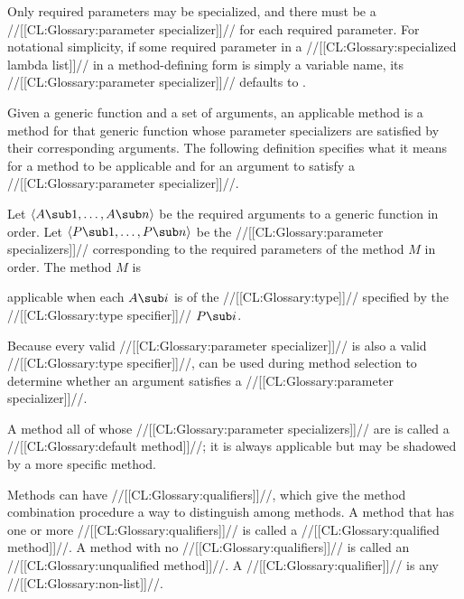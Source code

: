 Only required parameters may be specialized, and there must be a
//[[CL:Glossary:parameter specializer]]// for each required parameter.  For notational
simplicity, if some required parameter in a //[[CL:Glossary:specialized lambda list]]// in
a method-defining form is simply a variable name, its 
//[[CL:Glossary:parameter specializer]]// defaults to .

Given a generic function and a set of arguments, an applicable
method is a method for that generic function whose parameter
specializers are satisfied by their corresponding arguments.  The
following definition specifies what it means for a method to be
applicable and for an argument to satisfy a //[[CL:Glossary:parameter specializer]]//.






Let $\langle A\sub 1, \ldots, A\sub n\rangle$ be the required
arguments to a generic function in order. Let $\langle P\sub 1,
\ldots, P\sub n\rangle$ be the //[[CL:Glossary:parameter specializers]]// corresponding to
the required parameters of the method $M$ in order.  The method $M$ is








applicable when each $A\sub i$ is of the //[[CL:Glossary:type]]// specified by 
the //[[CL:Glossary:type specifier]]// $P\sub i$.























Because every valid //[[CL:Glossary:parameter specializer]]// is 
also a valid //[[CL:Glossary:type specifier]]//,  can be used during method
selection to determine whether an argument satisfies a //[[CL:Glossary:parameter specializer]]//.  

A method all of whose //[[CL:Glossary:parameter specializers]]// are 
 is called a //[[CL:Glossary:default method]]//; it is always applicable but
may be shadowed by a more specific method.

Methods can have //[[CL:Glossary:qualifiers]]//, which give the method combination
procedure a way to distinguish among methods.  A method that has one
or more //[[CL:Glossary:qualifiers]]// is called a //[[CL:Glossary:qualified method]]//.
A method with no //[[CL:Glossary:qualifiers]]// is called an //[[CL:Glossary:unqualified method]]//. 
A //[[CL:Glossary:qualifier]]// is any //[[CL:Glossary:non-list]]//.



